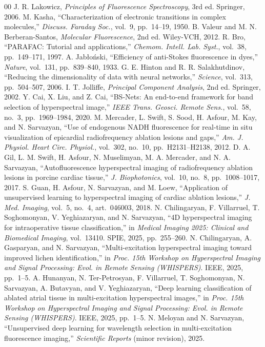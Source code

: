 \documentclass[conference]{IEEEtran}
\begin{document}
\begin{thebibliography}{00}
 J. R. Lakowicz, \emph{Principles of Fluorescence Spectroscopy},
3rd ed. Springer, 2006.
 M. Kasha, ``Characterization of electronic transitions in complex
molecules,'' \emph{Discuss. Faraday Soc.}, vol.~9, pp.~14--19, 1950.
 B. Valeur and M. N. Berberan-Santos, \emph{Molecular Fluorescence},
2nd ed. Wiley-VCH, 2012.
 R. Bro, ``PARAFAC: Tutorial and applications,'' \emph{Chemom. Intell.
Lab. Syst.}, vol.~38, pp.~149--171, 1997.
 A. Jab\l{}o\'nski, ``Efficiency of anti-Stokes fluorescence in
dyes,'' \emph{Nature}, vol.~131, pp.~839--840, 1933.
 G. E. Hinton and R. R. Salakhutdinov, ``Reducing the dimensionality
of data with neural networks,'' \emph{Science}, vol.~313, pp.~504--507, 2006.
 I. T. Jolliffe, \emph{Principal Component Analysis}, 2nd ed.
Springer, 2002.
 Y. Cai, X. Liu, and Z. Cai, ``BS-Nets: An end-to-end framework for
band selection of hyperspectral image,'' \emph{IEEE Trans. Geosci. Remote Sens.},
vol.~58, no.~3, pp.~1969--1984, 2020.
 M. Mercader, L. Swift, S. Sood, H. Asfour, M. Kay, and
N. Sarvazyan, ``Use of endogenous NADH fluorescence for real-time in situ visualization
of epicardial radiofrequency ablation lesions and gaps,'' \emph{Am. J. Physiol. Heart
Circ. Physiol.}, vol.~302, no.~10, pp.~H2131--H2138, 2012.
 D. A. Gil, L. M. Swift, H. Asfour, N. Muselimyan, M. A. Mercader, and
N. A. Sarvazyan, ``Autofluorescence hyperspectral imaging of radiofrequency ablation
lesions in porcine cardiac tissue,'' \emph{J. Biophotonics}, vol.~10, no.~8,
pp.~1008--1017, 2017.
 S. Guan, H. Asfour, N. Sarvazyan, and M. Loew, ``Application of
unsupervised learning to hyperspectral imaging of cardiac ablation lesions,'' \emph{J.
Med. Imaging}, vol.~5, no.~4, art.~046003, 2018.
 N. Chilingaryan, F. Villarruel, T. Soghomonyan, V. Yeghiazaryan, and
N. Sarvazyan, ``4D hyperspectral imaging for intraoperative tissue classification,'' in
\emph{Medical Imaging 2025: Clinical and Biomedical Imaging}, vol.~13410. SPIE, 2025,
pp.~255--260.
 N. Chilingaryan, A. Gasparyan, and N. Sarvazyan, ``Multi-excitation
hyperspectral imaging toward improved lichen identification,'' in \emph{Proc. 15th Workshop
on Hyperspectral Imaging and Signal Processing: Evol. in Remote Sensing (WHISPERS)}. IEEE,
2025, pp.~1--5.
 A. Hunanyan, N. Ter-Petrosyan, F. Villarruel, T. Soghomonyan,
N. Sarvazyan, A. Butavyan, and V. Yeghiazaryan, ``Deep learning classification of ablated
atrial tissue in multi-excitation hyperspectral images,'' in \emph{Proc. 15th Workshop on
Hyperspectral Imaging and Signal Processing: Evol. in Remote Sensing (WHISPERS)}. IEEE,
2025, pp.~1--5.
 N. Meloyan and N. Sarvazyan, ``Unsupervised deep learning for
wavelength selection in multi-excitation fluorescence imaging,'' \emph{Scientific Reports}
(minor revision), 2025.
\end{thebibliography}
\end{document}
